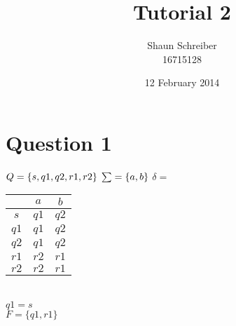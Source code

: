 \documentclass[a4paper, 10pt]{article}
\date{12 February 2014}
\author{Shaun Schreiber \\ 16715128}
\title{Tutorial 2}
\begin{document}
\maketitle
\section*{Question 1}
$Q = \{s, q1, q2, r1, r2\}\\$
$\sum = \{a, b\}\\$
$\delta =$
\begin{table}[h!t]
\centering
\begin{tabular}{c | c c}
 & $a$ & $b$ \\
\hline
$s$ & $q1$ & $q2$ \\
$q1$ & $q1$ & $q2$\\
$q2$ & $q1$ & $q2$\\
$r1$ & $r2$ & $r1$\\
$r2$ & $r2$ & $r1$\\
\end{tabular}
\end{table}\\
$q1 = s$\\
$F = \{q1, r1\}$
\end{document}
